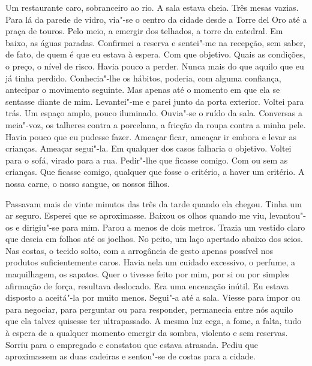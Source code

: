 Um restaurante caro, sobranceiro ao rio. A sala estava cheia. Três mesas
vazias. Para lá da parede de vidro, via"-se o centro da cidade desde a
Torre del Oro até a praça de touros. Pelo meio, a emergir dos telhados,
a torre da catedral. Em baixo, as águas paradas. Confirmei a reserva e
sentei"-me na recepção, sem saber, de fato, de quem é que eu estava à
espera. Com que objetivo. Quais as condições, o preço, o nível de
risco. Havia pouco a perder. Nunca mais do que aquilo que eu já tinha
perdido. Conhecia"-lhe os hábitos, poderia, com alguma confiança,
antecipar o movimento seguinte. Mas apenas até o momento em que ela se
sentasse diante de mim. Levantei"-me e parei junto da porta exterior.
Voltei para trás. Um espaço amplo, pouco iluminado. Ouvia"-se o ruído da
sala. Conversas a meia"-voz, os talheres contra a porcelana, a fricção
da roupa contra a minha pele. Havia pouco que eu pudesse fazer. Ameaçar
ficar, ameaçar ir embora e levar as crianças. Ameaçar segui"-la. Em
qualquer dos casos falharia o objetivo. Voltei para o sofá, virado para
a rua. Pedir"-lhe que ficasse comigo. Com ou sem as crianças. Que
ficasse comigo, qualquer que fosse o critério, a haver um critério. A
nossa carne, o nosso sangue, os nossos filhos.

Passavam mais de vinte minutos das três da tarde quando ela chegou.
Tinha um ar seguro. Esperei que se aproximasse. Baixou os olhos quando
me viu, levantou"-os e dirigiu"-se para mim. Parou a menos de dois
metros. Trazia um vestido claro que descia em folhos até os joelhos. No
peito, um laço apertado abaixo dos seios. Nas costas, o tecido solto,
com a arrogância de gesto apenas possível nos produtos suficientemente
caros. Havia nela um cuidado excessivo, o perfume, a maquilhagem, os
sapatos. Quer o tivesse feito por mim, por si ou por simples afirmação
de força, resultava deslocado. Era uma encenação inútil. Eu estava
disposto a aceitá"-la por muito menos. Segui"-a até a sala. Viesse para
impor ou para negociar, para perguntar ou para responder, permanecia
entre nós aquilo que ela talvez quisesse ter ultrapassado. A mesma luz
cega, a fome, a falta, tudo à espera de a qualquer momento emergir da
sombra, violento e sem reservas. Sorriu para o empregado e constatou que
estava atrasada. Pediu que aproximassem as duas cadeiras e sentou"-se de
costas para a cidade.

